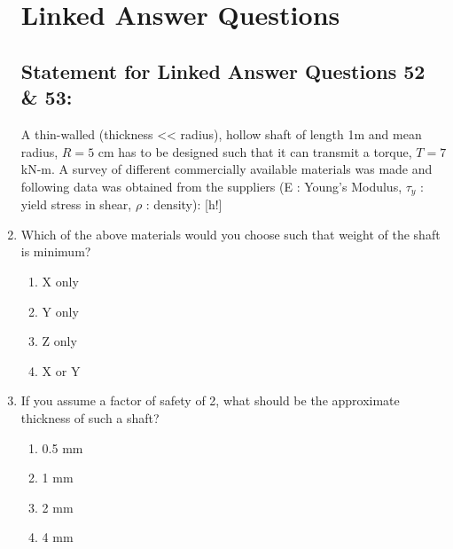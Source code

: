 \documentclass[journal]{IEEEtran}
\begin{document}
\begin{enumerate}
\section*{Linked Answer Questions}
\subsection*{Statement for Linked Answer Questions 52 \& 53:}
A thin-walled (thickness << radius), hollow shaft of length 1m and mean radius, $R = 5$ cm has to be designed such that it can transmit a torque, $T = 7$ kN-m. A survey of different commercially available materials was made and following data was obtained from the suppliers (E : Young's Modulus, $\tau_y$ : yield stress in shear, $\rho$ : density):
[h!]
\item Which of the above materials would you choose such that weight of the shaft is minimum?
\begin{multicols}{2}
    \begin{enumerate}
        \item X only
        \item Y only
        \item Z only
        \item X or Y
    \end{enumerate}
\end{multicols}
\item If you assume a factor of safety of 2, what should be the approximate thickness of such a shaft?
\begin{multicols}{2}
    \begin{enumerate}
        \item 0.5 mm
        \item 1 mm
        \item 2 mm
        \item 4 mm
    \end{enumerate}
\end{multicols}
\end{enumerate}
\end{document}

